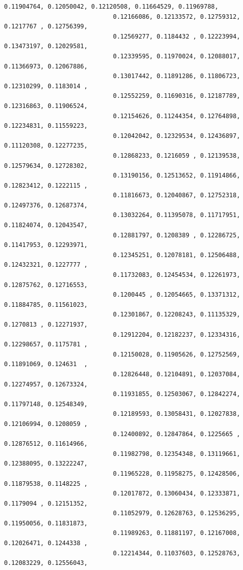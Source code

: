 \documentclass[11pt]{article}
\begin{document}
\begin{Verbatim}[commandchars=\\\{\}]
                              0.11904764, 0.12050042, 0.12120508, 0.11664529, 0.11969788,
                              0.12166086, 0.12133572, 0.12759312, 0.1217767 , 0.12756399,
                              0.12569277, 0.1184432 , 0.12223994, 0.13473197, 0.12029581,
                              0.12339595, 0.11970024, 0.12088017, 0.11366973, 0.12067886,
                              0.13017442, 0.11891286, 0.11806723, 0.12310299, 0.1183014 ,
                              0.12552259, 0.11690316, 0.12187789, 0.12316863, 0.11906524,
                              0.12154626, 0.11244354, 0.12764898, 0.12234831, 0.11559223,
                              0.12042042, 0.12329534, 0.12436897, 0.11120308, 0.12277235,
                              0.12868233, 0.1216059 , 0.12139538, 0.12579634, 0.12728302,
                              0.13190156, 0.12513652, 0.11914866, 0.12823412, 0.1222115 ,
                              0.11816673, 0.12040867, 0.12752318, 0.12497376, 0.12687374,
                              0.13032264, 0.11395078, 0.11717951, 0.11824074, 0.12043547,
                              0.12881797, 0.1208389 , 0.12286725, 0.11417953, 0.12293971,
                              0.12345251, 0.12078181, 0.12506488, 0.12432321, 0.1227777 ,
                              0.11732083, 0.12454534, 0.12261973, 0.12875762, 0.12716553,
                              0.1200445 , 0.12054665, 0.13371312, 0.11884785, 0.11561023,
                              0.12301867, 0.12208243, 0.11135329, 0.1270813 , 0.12271937,
                              0.12912204, 0.12182237, 0.12334316, 0.12298657, 0.1175781 ,
                              0.12150028, 0.11905626, 0.12752569, 0.11891069, 0.124631  ,
                              0.12826448, 0.12104891, 0.12037084, 0.12274957, 0.12673324,
                              0.11931855, 0.12503067, 0.12842274, 0.11797148, 0.12548349,
                              0.12189593, 0.13058431, 0.12027838, 0.12106994, 0.1208059 ,
                              0.12400892, 0.12847864, 0.1225665 , 0.12876512, 0.11614966,
                              0.11982798, 0.12354348, 0.13119661, 0.12388095, 0.13222247,
                              0.11965228, 0.11958275, 0.12428506, 0.11879538, 0.1148225 ,
                              0.12017872, 0.13060434, 0.12333871, 0.1179094 , 0.12151352,
                              0.11052979, 0.12628763, 0.12536295, 0.11950056, 0.11831873,
                              0.11989263, 0.11881197, 0.12167008, 0.12026471, 0.1244338 ,
                              0.12214344, 0.11037603, 0.12528763, 0.12083229, 0.12556043,

\end{Verbatim}
\end{document}
